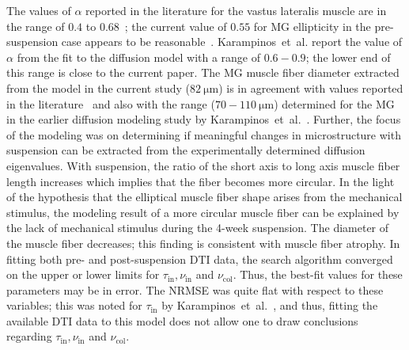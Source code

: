 The values of $\alpha$ reported in the literature for the vastus lateralis muscle are in the range of $0.4$ to $0.68$~\cite{RND38, RND39}; the current value of $0.55$ for MG ellipticity in the pre-suspension case appears to be reasonable~\cite{RND38, RND39}.
Karampinos~et~al. report the value of $\alpha$ from the fit to the diffusion model with a range of $0.6 - 0.9$; the lower end of this range is close to the current paper.
The MG muscle fiber diameter extracted from the model in the current study ($\SI{82}{\micro\meter}$) is in agreement with values reported in the literature~\cite{RND38} and also with the range ($70 - \SI{110}{\micro\meter}$) determined for the MG in the earlier diffusion modeling study by Karampinos~et~al.~\cite{RND12}.
Further, the focus of the modeling was on determining if meaningful changes in microstructure with suspension can be extracted from the experimentally determined diffusion eigenvalues.
With suspension, the ratio of the short axis to long axis muscle fiber length increases which implies that the fiber becomes more circular.
In the light of the hypothesis that the elliptical muscle fiber shape arises from the mechanical stimulus, the modeling result of a more circular muscle fiber can be explained by the lack of mechanical stimulus during the 4-week suspension.
The diameter of the muscle fiber decreases; this finding is consistent with muscle fiber atrophy. 
In fitting both pre- and post-suspension DTI data, the search algorithm converged on the upper or lower limits for $\tau_{\mathrm{in}}, \nu_{\mathrm{in}}$ and $\nu_{\mathrm{col}}$.
Thus, the best-fit values for these parameters may be in error. 
The NRMSE was quite flat with respect to these variables; this was noted for $\tau_{\mathrm{in}}$ by Karampinos~et~al.~\cite{RND12}, and thus, fitting the available DTI data to this model does not allow one to draw conclusions regarding $\tau_{\mathrm{in}}, \nu_{\mathrm{in}}$ and $\nu_{\mathrm{col}}$.

